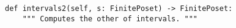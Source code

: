 \begin{verbatim}
def intervals2(self, s: FinitePoset) -> FinitePoset:
    """ Computes the other of intervals. """
\end{verbatim}